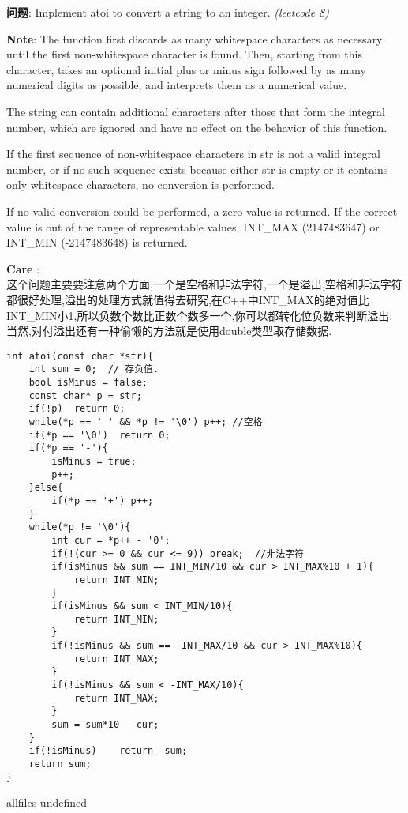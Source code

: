 \documentclass{article}
\begin{document}
\begin{CJK}{UTF8}{gbsn}     %

\else
    
\begin{description}
    \item{\textbf{问题}}: Implement atoi to convert a string to an integer. \textit{(leetcode 8)}
	\item{\textbf{Note}}: The function first discards as many whitespace characters as necessary until the first non-whitespace character is found. Then, starting from this character, takes an optional initial plus or minus sign followed by as many numerical digits as possible, and interprets them as a numerical value.

The string can contain additional characters after those that form the integral number, which are ignored and have no effect on the behavior of this function.

If the first sequence of non-whitespace characters in str is not a valid integral number, or if no such sequence exists because either str is empty or it contains only whitespace characters, no conversion is performed.

If no valid conversion could be performed, a zero value is returned. If the correct value is out of the range of representable values, INT\_MAX (2147483647) or INT\_MIN (-2147483648) is returned.
    \item{\textbf{Care}} : 
    \\这个问题主要要注意两个方面,一个是空格和非法字符,一个是溢出,空格和非法字符都很好处理,溢出的处理方式就值得去研究,在C++中INT\_MAX的绝对值比INT\_MIN小1,所以负数个数比正数个数多一个,你可以都转化位负数来判断溢出. 当然,对付溢出还有一种偷懒的方法就是使用double类型取存储数据.
    \begin{lstlisting}
int atoi(const char *str){
	int sum = 0;  // 存负值.
	bool isMinus = false;
	const char* p = str;
	if(!p)	return 0;
	while(*p == ' ' && *p != '\0') p++; //空格
	if(*p == '\0')	return 0;
	if(*p == '-'){
		isMinus = true;
		p++;
	}else{
		if(*p == '+') p++;
	}
	while(*p != '\0'){
		int cur = *p++ - '0';
		if(!(cur >= 0 && cur <= 9))	break;  //非法字符
		if(isMinus && sum == INT_MIN/10 && cur > INT_MAX%10 + 1){
			return INT_MIN;
		}
		if(isMinus && sum < INT_MIN/10){
			return INT_MIN;
		}
		if(!isMinus && sum == -INT_MAX/10 && cur > INT_MAX%10){
			return INT_MAX;
		}
		if(!isMinus && sum < -INT_MAX/10){
			return INT_MAX;
		}
		sum = sum*10 - cur;
	}
	if(!isMinus)	return -sum;
	return sum;
}
    \end{lstlisting}
\end{description}

\fi

\ifx allfiles undefined
\end{CJK}
\end{document}

